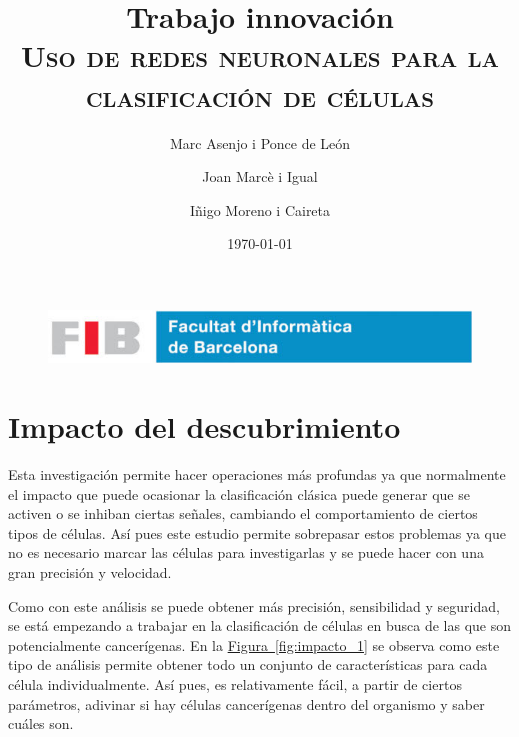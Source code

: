 \documentclass[a4paper, 12pt, UTF8]{article}
\title{
	\Huge
	\textbf{Trabajo innovación} \\
	\scshape Uso de redes neuronales para la clasificación de células
	}
\author{
	Marc Asenjo i Ponce de León \and
	Joan Marcè i Igual \and
	Iñigo Moreno i Caireta
	}
\date{\today}
\begin{document}
\maketitle

\begin{figure}
	\centering
	\includegraphics[width=\linewidth]{./simple_FIB}
\end{figure}

\newpage
\tableofcontents

\newpage

\section{Impacto del descubrimiento}

Esta investigación permite hacer operaciones más profundas ya que normalmente el impacto que puede ocasionar la clasificación clásica puede generar que se activen o se inhiban ciertas señales, cambiando el comportamiento de ciertos tipos de células. Así pues este estudio permite sobrepasar estos problemas ya que no es necesario marcar las células para investigarlas y se puede hacer con una gran precisión y velocidad.

Como con este análisis se puede obtener más precisión, sensibilidad y seguridad, se está empezando a trabajar en la clasificación de células en busca de las que son potencialmente cancerígenas. En la \hyperref[fig:impacto_1]{Figura~\ref{fig:impacto_1}} se observa como este tipo de análisis permite obtener todo un conjunto de características para cada célula individualmente. 
Así pues, es relativamente fácil, a partir de ciertos parámetros, adivinar si hay células cancerígenas dentro del organismo y saber cuáles son.
\end{document}
